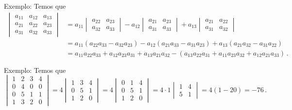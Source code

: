 \documentclass[12pt,a4paper]{report}
\newcommand{\mb}{\mathbf}
\newtheorem{cor}[thm]{Corolário}
\begin{document}
Exemplo: Temos que
  \begin{equation*}
    \begin{split}
      \begin{vmatrix}
        a_{11}&a_{12}&a_{13}\\
        a_{21}&a_{22}&a_{23}\\
        a_{31}&a_{32}&a_{33}
      \end{vmatrix}&=a_{11}\begin{vmatrix}
        a_{22}&a_{23}\\
        a_{32}&a_{33}
      \end{vmatrix}-a_{12}\begin{vmatrix}
        a_{21}&a_{23}\\
        a_{31}&a_{33}
      \end{vmatrix}+a_{13}\begin{vmatrix}
        a_{21}&a_{22}\\
        a_{31}&a_{32}
      \end{vmatrix}\\
      &=a_{11}(a_{22}a_{33}-a_{32}a_{23})-a_{12}(a_{21}a_{33}-a_{31}a_{23})+a_{13}(a_{21}a_{32}-a_{31}a_{22})\\
      &=a_{11}a_{22}a_{33}+a_{12}a_{23}a_{31}+a_{13}a_{21}a_{32}-(a_{13}a_{22}a_{31}+a_{11}a_{23}a_{32}+a_{12}a_{21}a_{33})\,.
    \end{split}
  \end{equation*}

%

Exemplo: Temos que
$$\begin{vmatrix}
  1&2&3&4\\
  0&4&0&0\\
  0&5&1&1\\
  1&3&2&0
\end{vmatrix}=4 \begin{vmatrix}
  1&3&4\\
  0&5&1\\
  1&2&0
\end{vmatrix}=4\begin{vmatrix}
  0&1&4\\
  0&5&1\\
  1&2&0
\end{vmatrix}=4\cdot 1 \begin{vmatrix}
  1&4\\
  5&1
\end{vmatrix}=4(1-20)=-76\,.$$
\end{document}
